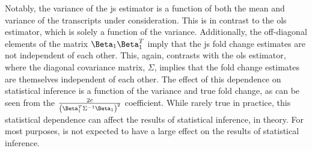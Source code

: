 Notably, the variance of the \gls{js} estimator is a function of both the mean and variance of the transcripts under consideration.
This is in contrast to the \gls{ols} estimator, which is solely a function of the variance.
Additionally, the off-diagonal elements of the matrix $\Beta_1 \Beta_1^T$ imply that the \gls{js} fold change estimates are not independent of each other.
This, again, contrasts with the \gls{ols} estimator, where the diagonal covariance matrix, $\Sigma$, implies that the fold change estimates are themselves independent of each other.
The effect of this dependence on statistical inference is a function of the variance and true fold change, as can be seen from the $\frac{2c}{\left( \Beta_1^T \Sigma^{-1} \Beta_1 \right)^2}$ coefficient.
While rarely true in practice, this statistical dependence can affect the results of statistical inference, in theory.
For most purposes, is not expected to have a large effect on the results of statistical inference.
